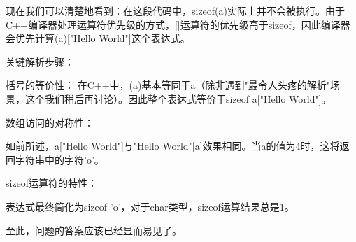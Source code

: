 现在我们可以清楚地看到：在这段代码中，sizeof(a)实际上并不会被执行。由于C++编译器处理运算符优先级的方式，[]运算符的优先级高于sizeof，因此编译器会优先计算(a)["Hello World"]这个表达式。

关键解析步骤：

括号的等价性：
在C++中，(a)基本等同于a（除非遇到"最令人头疼的解析"场景，这个我们稍后再讨论）。因此整个表达式等价于sizeof a["Hello World"]。

数组访问的对称性：

如前所述，a["Hello World"]与"Hello World"[a]效果相同。当a的值为4时，这将返回字符串中的字符'o'。

sizeof运算符的特性：

表达式最终简化为sizeof 'o'，对于char类型，sizeof运算结果总是1。

至此，问题的答案应该已经显而易见了。